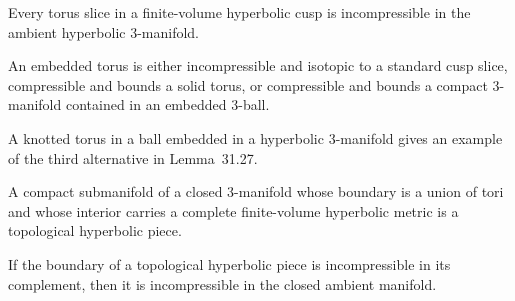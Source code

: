 \begin{lemma}
\label{lem:chow-iv-boundary-torus-incompressible}

Every torus slice in a finite-volume hyperbolic cusp is incompressible in the
ambient hyperbolic 3-manifold.
\end{lemma}

\begin{lemma}
\label{lem:chow-iv-embedded-torus-trichotomy}

An embedded torus is either incompressible and isotopic to a standard cusp
slice, compressible and bounds a solid torus, or compressible and bounds a
compact 3-manifold contained in an embedded 3-ball.
\end{lemma}

\begin{example}
\label{ex:chow-iv-knotted-compressible-torus}

A knotted torus in a ball embedded in a hyperbolic 3-manifold gives an example
of the third alternative in Lemma~31.27.
\end{example}

\begin{definition}
\label{def:chow-iv-topological-hyperbolic-piece}

A compact submanifold of a closed 3-manifold whose boundary is a union of tori
and whose interior carries a complete finite-volume hyperbolic metric is a
topological hyperbolic piece.
\end{definition}

\begin{corollary}
\label{cor:chow-iv-hyperbolic-piece-incompressibility}


If the boundary of a topological hyperbolic piece is incompressible in its
complement, then it is incompressible in the closed ambient manifold.
\end{corollary}

